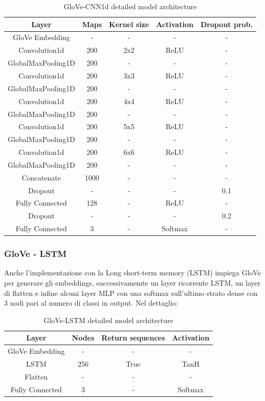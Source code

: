 \begin{table}[!ht]
\centering
\begin{tabular}{ccccc}
\toprule
Layer & Maps & Kernel size & Activation & Dropout prob.\\
\midrule
    GloVe Embedding & - & - & - & - \\
    Convolution1d & 200 & 2x2 & ReLU & -\\
    GlobalMaxPooling1D & 200 & - & - & -\\
    Convolution1d & 200 & 3x3 & ReLU & -\\
    GlobalMaxPooling1D & 200 & - & - & -\\
    Convolution1d & 200 & 4x4 & ReLU & -\\
    GlobalMaxPooling1D & 200 & - & - & -\\
    Convolution1d & 200 & 5x5 & ReLU & -\\
    GlobalMaxPooling1D & 200 & - & - & -\\
    Convolution1d & 200 & 6x6 & ReLU & -\\
    GlobalMaxPooling1D & 200 & - & - & -\\
    Concatenate & 1000 & - & - & -\\
    Dropout & - & - & - & 0.1\\
    Fully Connected & 128 & - & ReLU & -\\
    Dropout & - & - & - & 0.2\\
    Fully Connected & 3 & - & Softmax & -\\
\bottomrule
\end{tabular}
\caption{GloVe-CNN1d detailed model architecture}
\label{tab:cnn}
\end{table}

  \subsubsection{GloVe - LSTM}
  Anche l'implementazione con la Long short-term memory (LSTM) impiega GloVe per generare gli embeddings, successivamemte un layer ricorrente LSTM, un layer di flatten e infine alcuni layer MLP con una softmax sull'ultimo strato dense con 3 nodi pari al numero di classi in output. Nel dettaglio:
\begin{table}[!ht]
\centering
\begin{tabular}{cccc}
\toprule
Layer & Nodes & Return sequences & Activation \\
\midrule
    GloVe Embedding & - & - & - \\
    LSTM & 256 & True & TanH \\
    Flatten & - & - & - \\
    Fully Connected & 3 & - & Softmax\\
\bottomrule
\end{tabular}
\caption{GloVe-LSTM detailed model architecture}
\end{table}
  

